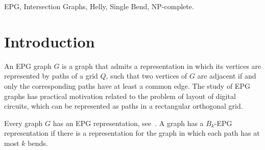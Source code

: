 \documentclass[a4paper,11pt]{article}
\begin{document}
\begin{abstract}


\end{abstract}

\bigskip
\begin{keywords}
EPG, Intersection Graphs, Helly, Single Bend, NP-complete.

\bigskip
{}
\end{keywords}

\newpage

\section{Introduction}

An EPG graph $G$ is a graph that admits a representation in which its vertices are represented by paths of a grid $Q$, such that two vertices of $G$ are adjacent if and only the corresponding paths have at least a common edge. The study of EPG graphs has practical motivation related to the problem of layout of digital circuits, which can be represented as paths in a rectangular orthogonal grid.

Every graph $G$ has an EPG representation, see~\citep{golumbic2009}. A graph has a $ B_k$-EPG representation if there is a representation for the graph in which each path has at most $k$ bends.
\end{document}

